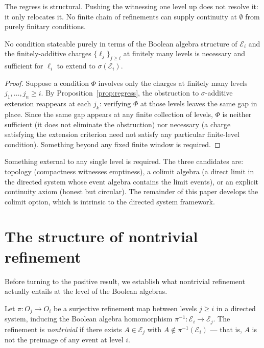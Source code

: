 \noindent The regress is structural.  Pushing the witnessing one level up does not
resolve it: it only relocates it.  No finite chain of refinements can supply continuity
at $\emptyset$ from purely finitary conditions.

\begin{corollary}
\label{cor:no-finitary}
No condition stateable purely in terms of the Boolean algebra structure of
$\mathcal{E}_i$ and the finitely-additive charges $\{\ell_j\}_{j \geq i}$ at
finitely many levels is necessary and sufficient for $\ell_i$ to extend to
$\sigma(\mathcal{E}_i)$.
\end{corollary}

\begin{proof}
Suppose a condition $\Phi$ involves only the charges at finitely many levels
$j_1, \ldots, j_n \geq i$.  By Proposition~\ref{prop:regress}, the obstruction
to $\sigma$-additive extension reappears at each $j_k$: verifying $\Phi$ at
those levels leaves the same gap in place.  Since the same gap appears at any
finite collection of levels, $\Phi$ is neither sufficient (it does not eliminate
the obstruction) nor necessary (a charge satisfying the extension criterion need
not satisfy any particular finite-level condition).  Something beyond any fixed
finite window is required.
\end{proof}

\noindent Something external to any single level is required.  The three candidates
are: topology (compactness witnesses emptiness), a colimit algebra (a direct limit in
the directed system whose event algebra contains the limit events), or an explicit
continuity axiom (honest but circular).  The remainder of this paper develops the
colimit option, which is intrinsic to the directed system framework.

\section{The structure of nontrivial refinement}
\label{sec:incompleteness}

Before turning to the positive result, we establish what nontrivial refinement
actually entails at the level of the Boolean algebras.

\begin{definition}
\label{def:nontrivial}
Let $\pi : O_j \to O_i$ be a surjective refinement map between levels $j \geq i$
in a directed system, inducing the Boolean algebra homomorphism
$\pi^{-1} : \mathcal{E}_i \to \mathcal{E}_j$.  The refinement is \emph{nontrivial}
if there exists $A \in \mathcal{E}_j$ with $A \notin \pi^{-1}(\mathcal{E}_i)$ ---
that is, $A$ is not the preimage of any event at level $i$.
\end{definition}

